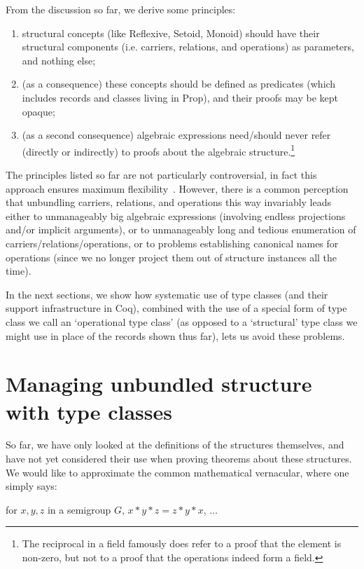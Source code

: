 \documentclass[a4paper,10pt,runningheads]{llncs}
\begin{document}
From the discussion so far, we derive some principles:
\begin{enumerate}
 \item structural concepts (like Reflexive, Setoid, Monoid) should have their structural components
(i.e. carriers, relations, and operations) as parameters, and nothing else;
 \item (as a consequence) these concepts should be defined as predicates (which includes records and
classes living in Prop), and their proofs may be kept opaque;
 \item (as a second consequence) algebraic expressions need/should never refer (directly or
indirectly) to proofs about the algebraic structure.\footnote{The reciprocal in a field
famously does refer to a proof that the element is non-zero, but not to a proof that the operations
indeed form a field.}
\end{enumerate}

The principles listed so far are not particularly controversial, in fact this
approach ensures maximum flexibility~\cite{Hints}. However,
there is a common perception that unbundling carriers, relations, and operations this way invariably
leads either to unmanageably big algebraic expressions (involving endless projections and/or implicit
arguments), or to unmanageably long and tedious enumeration of carriers/relations/operations, or to
problems establishing canonical names for operations (since we no longer project them out of
structure instances all the time).

In the next sections, we show how systematic use of type classes (and their support infrastructure
in Coq), combined with the use of a special form of type class we call an `operational type class'
(as opposed to a `structural' type class we might use in place of the records shown thus far), lets
us avoid these problems.

\section{Managing unbundled structure with type classes}

So far, we have only looked at the definitions of the structures themselves, and have not yet
considered their use when proving theorems about these structures.
We would like to approximate the common mathematical vernacular, where one
simply says:

for $x, y, z$ in a semigroup $G$, $x * y * z = z * y * x$, $\ldots$
\end{document}
